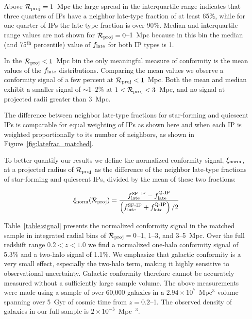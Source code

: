 Above $\mathcal{R}_{\text{proj}}=1$~Mpc the large spread in the interquartile range indicates that three quarters of IPs have a neighbor late-type fraction of at least 65\%, while for one quarter of IPs the late-type fraction is over 90\%.
Median and interquartile range values are not shown for $\mathcal{R}_{\text{proj}}=0$--1~Mpc because in this bin the median (and 75$^{\textrm{th}}$ percentile) value of $\flate$ for both IP types is 1.

In the $\mathcal{R}_{\text{proj}}<1$~Mpc bin the only meaningful measure of conformity is the mean values of the $\flate$ distributions.
Comparing the mean values we observe a conformity signal of a few percent at $\mathcal{R}_{\text{proj}}<1$~Mpc.
Both the mean and median exhibit a smaller signal of $\sim$1--2\% at $1<\mathcal{R}_{\text{proj}}<3$~Mpc, and no signal at projected radii greater than 3~Mpc.

The difference between neighbor late-type fractions for star-forming and quiescent IPs is comparable for equal weighting of IPs as shown here and when each IP is weighted proportionally to its number of neighbors, as shown in Figure~\ref{fig:latefrac_matched}.





To better quantify our results we define the normalized conformity signal, 
$\signorm$, at a projected radius of $\mathcal{R}_{\text{proj}}$ as the difference of the neighbor late-type fractions of star-forming and quiescent IPs, 
divided by the mean of these two fractions:

\begin{equation}
	\signorm(\Rproj) = \frac
	{ f^{\textrm{SF-IP}}_{\textrm{late}}-f^{\textrm{Q-IP}}_{\textrm{late}} }
	{ \left( f^{\textrm{SF-IP}}_{\textrm{late}}+f^{\textrm{Q-IP}}_{\textrm{late}} \right) /2}
\end{equation}

Table~\ref{table:signal} presents the 
normalized conformity signal in the matched sample in integrated radial bins of 
${\mathcal{R}_{\text{proj}}=0}$--1, 1--3, and 3--5~Mpc.
Over the full redshift range ${0.2<z<1.0}$ we find a normalized one-halo conformity 
signal of 5.3\% and a two-halo signal of 1.1\%.
We emphasize that galactic conformity is a very small effect, especially the two-halo term, making it highly sensitive to observational uncertainty.
Galactic conformity therefore cannot be accurately measured without a sufficiently large sample volume.
The above measurements were made using a sample of over 60,000 galaxies in a ${2.94\times10^7}$~Mpc$^3$ volume spanning over 5~Gyr of cosmic time from $z=0.2$--1.
The observed density of galaxies in our full sample is ${2\times10^{-3}}$~Mpc$^{-3}$.

